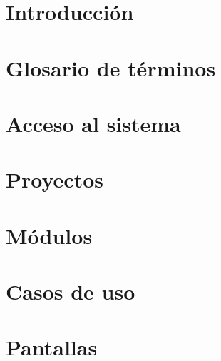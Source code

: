 \documentclass[10pt]{book}
\begin{document}

\thispagestyle{empty}


\frontmatter
\tableofcontents
\listoffigures
\mainmatter

 \hideControlVersion

\chapter{Introducción}\label{chp:introduccion}
\hypertarget{chp:introduccion}{}
\chapter{Glosario de términos}\label{cap:glosario}
\chapter{Acceso al sistema}\label{cap:iniciarSesion}
\chapter{Proyectos}\label{cap:gestionarProyectos}
\chapter{Módulos}\label{cap:gestionarModulos}
\chapter{Casos de uso}\label{cap:gestionarCasosUso}
\chapter{Pantallas}\label{cap:gestionarPantallas}
\end{document}
